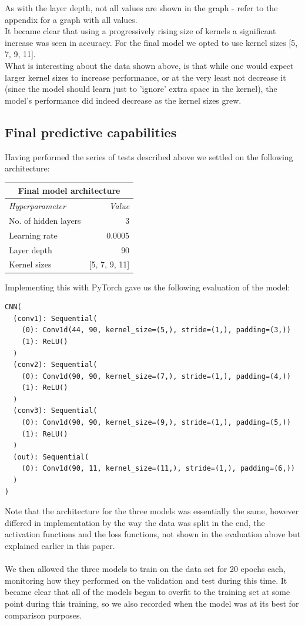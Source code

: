 \noindent As with the layer depth, not all values are shown in the graph - refer to the appendix for a graph with all values.\\
It became clear that using a progressively rising size of kernels a significant increase was seen in accuracy. For the final model we opted to use kernel sizes [5, 7, 9, 11].\\
What is interesting about the data shown above, is that while one would expect larger kernel sizes to increase performance, or at the very least not decrease it (since the model should learn just to 'ignore' extra space in the kernel), the model's performance did indeed decrease as the kernel sizes grew.



\subsection{Final predictive capabilities}
Having performed the series of tests described above we settled on the following architecture:
\begin{table}[H]
\centering
\begin{tabular}{lr}
\multicolumn{2}{c}{\textbf{Final model architecture}} \\ \hline
\multicolumn{1}{l|}{\textit{Hyperparameter}} & \textit{Value} \\ \hline
\multicolumn{1}{l|}{No. of hidden layers} & 3 \\
\multicolumn{1}{l|}{Learning rate} & 0.0005 \\
\multicolumn{1}{l|}{Layer depth} & 90 \\
\multicolumn{1}{l|}{Kernel sizes} & {[}5, 7, 9, 11{]}
\end{tabular}
\end{table}

\noindent Implementing this with PyTorch gave us the following evaluation of the model:
\begin{lstlisting}
CNN(
  (conv1): Sequential(
    (0): Conv1d(44, 90, kernel_size=(5,), stride=(1,), padding=(3,))
    (1): ReLU()
  )
  (conv2): Sequential(
    (0): Conv1d(90, 90, kernel_size=(7,), stride=(1,), padding=(4,))
    (1): ReLU()
  )
  (conv3): Sequential(
    (0): Conv1d(90, 90, kernel_size=(9,), stride=(1,), padding=(5,))
    (1): ReLU()
  )
  (out): Sequential(
    (0): Conv1d(90, 11, kernel_size=(11,), stride=(1,), padding=(6,))
  )
)
\end{lstlisting}
\noindent Note that the architecture for the three models was essentially the same, however differed in implementation by the way the data was split in the end, the activation functions and the loss functions, not shown in the evaluation above but explained earlier in this paper.\\
\\
We then allowed the three models to train on the data set for 20 epochs each, monitoring how they performed on the validation and test during this time. It became clear that all of the models began to overfit to the training set at some point during this training, so we also recorded when the model was at its best for comparison purposes.

